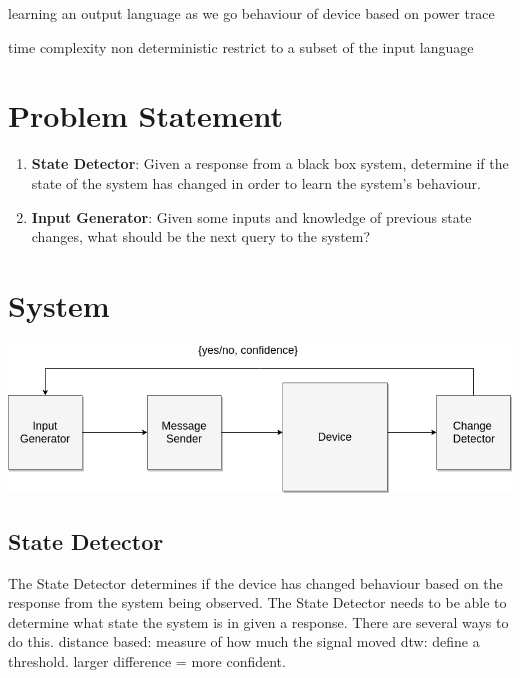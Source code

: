 \documentclass[11pt, a4paper]{article}
\begin{document}

learning an output language as we go
behaviour of device based on power trace

time complexity
non deterministic
restrict to a subset of the input language

\section*{Problem Statement} 

\begin{enumerate}
    \item \textbf{State Detector}: Given a response from a black box system, determine if the state of the system has changed in order to learn the system's behaviour.
    \item \textbf{Input Generator}: Given some inputs and knowledge of previous state changes, what should be the next query to the system?
\end{enumerate}

\section*{System}

\includegraphics[scale=0.5]{change-detector.png}

\subsection*{State Detector}
The State Detector determines if the device has changed behaviour based on the response from the system being observed.
The State Detector needs to be able to determine what state the system is in given a response.
There are several ways to do this.
distance based: measure of how much the signal moved
dtw: define a threshold. larger difference = more confident.
\end{document}
